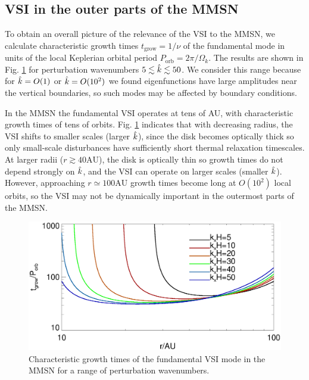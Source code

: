 \subsection{VSI in the outer parts of the MMSN}
To obtain an overall picture of the relevance of the VSI to the MMSN,
we calculate characteristic growth times $t_\mathrm{grow} = 1/\nu$ of 
the fundamental mode in units of the local Keplerian orbital period
$P_\mathrm{orb}= 2\pi/\Omega_k$. The results are shown in 
Fig. \ref{mmsn_overall} for perturbation wavenumbers $5\lesssim
\hat{k}\lesssim 50$. We consider this range because for  
$\hat{k}=O(1)$ or $\hat{k}=O(10^2)$ we found eigenfunctions have large
amplitudes near the vertical boundaries, so such modes may be affected
by boundary conditions. 

In the MMSN the fundamental VSI operates at tens of AU, with
characteristic growth times of tens of orbits. %
Fig. \ref{mmsn_overall} indicates that with decreasing radius, the VSI
shifts to smaller scales (larger $\hat{k}$), since the disk becomes optically
thick so only small-scale disturbances have sufficiently short thermal
relaxation timescales. At larger radii ($r\gtrsim 
40\mathrm{AU}$), the disk is optically thin so growth times do not depend strongly on   
$\hat{k}$, and the VSI can operate on larger scales (smaller $\hat{k}$).  
However, approaching 
$r\simeq 100\mathrm{AU}$ growth times become long at $O(10^2)$ local orbits,
so the VSI may not be dynamically important in the outermost parts of
the MMSN. 

\begin{figure}
  \includegraphics[width=\linewidth]{figures/eigen_compare_grow.ps}
  \caption{Characteristic growth times of the fundamental VSI mode in
    the MMSN for a range of perturbation wavenumbers.  
    \label{mmsn_overall}}    
\end{figure}



